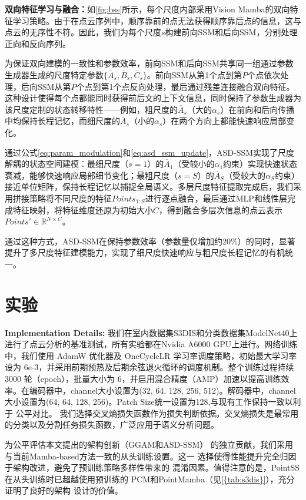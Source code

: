 \documentclass[preprint,12pt]{elsarticle}
\begin{document}
\textbf{双向特征学习与融合：}如\cref{fig:bss}所示，每个尺度内部采用Vision Mamba\cite{VisionMamba}的双向特征学习策略。由于在点云序列中，顺序靠前的点无法获得顺序靠后点的信息，这与点云的无序性不符。因此，我们为每个尺度$s$构建前向SSM和后向SSM，分别处理正向和反向序列。

为保证双向建模的一致性和参数效率，前向SSM和后向SSM共享同一组通过参数生成器生成的尺度特定参数$\{\overline{A}_s, \overline{B}_s, \overline{C}_s\}$。前向SSM从第1个点到第$P$个点依次处理，后向SSM从第$P$个点到第1个点反向处理，最后通过残差连接融合双向特征。这种设计使得每个点都能同时获得前后文的上下文信息，同时保持了参数生成器为该尺度定制的状态转移特性——例如，粗尺度的$\overline{A}_s$（大的$\alpha_s$）在前向和后向传播中均保持长程记忆，而细尺度的$\overline{A}_s$（小的$\alpha_s$）在两个方向上都能快速响应局部变化。

通过公式\ref{eq:param_modulation}和\ref{eq:asd_ssm_update}，ASD-SSM实现了尺度解耦的状态空间建模：最细尺度（$s=1$）的$\overline{A}_1$（受较小的$\alpha_1$约束）实现快速状态衰减，能够快速响应局部细节变化；最粗尺度（$s=S$）的$\overline{A}_S$（受较大的$\alpha_S$约束）接近单位矩阵，保持长程记忆以捕捉全局语义。多层尺度特征提取完成后，我们采用拼接策略将不同尺度的特征$Points_{1:S}$进行逐点融合，最后通过MLP和线性层完成特征映射，将特征维度还原为初始大小$C$，得到融合多层次信息的点云表示$Points'\in\mathbb{R}^{N\times C}$。

通过这种方式，ASD-SSM在保持参数效率（参数量仅增加约20\%）的同时，显著提升了多尺度特征建模能力，实现了细尺度快速响应与粗尺度长程记忆的有机统一。

\section{实验}
\textbf{Implementation Details:}
我们在室内数据集S3DIS和分类数据集ModelNet40上进行了点云分析的基准测试，所有实验都在Nvidia A6000 GPU上进行。网络训练中，我们使用 AdamW 优化器及 OneCycleLR 学习率调度策略，初始最大学习率设为 6e-3，并采用前期预热及后期余弦退火循环的调度机制。整个训练过程持续 3000 轮（epoch），批量大小为 6，并启用混合精度（AMP）加速以提高训练效率。在编码器中，channel大小设置为(32, 64, 128, 256, 512)。解码器中，channel大小设置为(64, 64, 128, 256)。Patch Size统一设置为128,与现有工作保持一致以利于
公平对比。
我们选择交叉熵损失函数作为损失判断依据。交叉熵损失是最常用的分类以及分割任务损失函数，广泛应用于语义分析问题。

为公平评估本文提出的架构创新（GGAM和ASD-SSM）
的独立贡献，我们采用与当前Mamba-based方法一致的从头训练设置。这一
选择使得性能提升完全归因于架构改进，避免了预训练策略多样性带来的
混淆因素。值得注意的是，PointSS在从头训练时已超越使用预训练的
PCM和PointMamba（见\cref{{tab:s3dis}}），充分证明了良好的架构
设计的价值。
\end{document}
